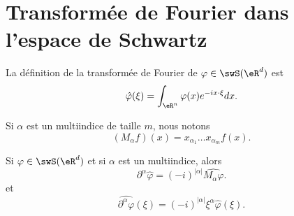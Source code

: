\section{Transformée de Fourier dans l'espace de Schwartz}

La définition de la transformée de Fourier de \( \varphi\in\swS(\eR^d)\) est
\begin{equation}
	\hat  \varphi(\xi)=\int_{\eR^n}\varphi(x) e^{-ix\cdot \xi}dx.
\end{equation}

Si \( \alpha\) est un multiindice de taille \( m\), nous notons
\begin{equation}
	(M_{\alpha}f)(x)=x_{\alpha_1}\ldots x_{\alpha_m}f(x).
\end{equation}

\begin{lemma}   \label{LemQPVQjCx}
	Si \( \varphi\in\swS(\eR^d)\) et si \( \alpha\) est un multiindice, alors
	\begin{equation}
		\partial^{\alpha}\hat\varphi=(-i)^{| \alpha |}\widehat{M_{\alpha}\varphi}.
	\end{equation}
	et
	\begin{equation}
		\widehat{\partial^{\alpha}\varphi}(\xi)=(-i)^{| \alpha |}\xi^{\alpha}\hat\varphi(\xi).
	\end{equation}
\end{lemma}

